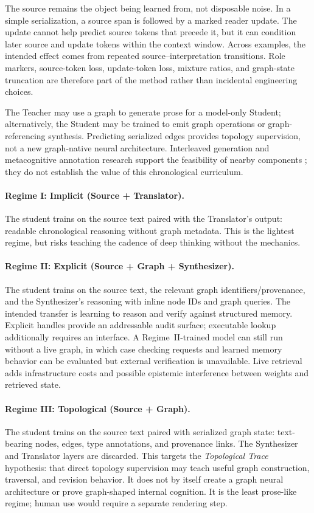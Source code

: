 The source remains the object being learned from, not disposable noise. In a
simple serialization, a source span is followed by a marked reader update. The
update cannot help predict source tokens that precede it, but it can condition
later source and update tokens within the context window. Across examples, the
intended effect comes from repeated source--interpretation transitions. Role
markers, source-token loss, update-token loss, mixture ratios, and graph-state
truncation are therefore part of the method rather than incidental engineering
choices.

The Teacher may use a graph to generate prose for a model-only Student;
alternatively, the Student may be trained to emit graph operations or
graph-referencing synthesis. Predicting serialized edges provides topology
supervision, not a new graph-native neural architecture. Interleaved generation
and metacognitive annotation research support the feasibility of nearby
components \cite{xie2025interleaved,didolkar2024metacognitive,korbak2023pretraining};
they do not establish the value of this chronological curriculum.

\paragraph{Regime I: Implicit (Source + Translator).} The student trains on the
source text paired with the Translator's output: readable chronological
reasoning without graph metadata. This is the lightest regime, but risks
teaching the cadence of deep thinking without the mechanics.

\paragraph{Regime II: Explicit (Source + Graph + Synthesizer).} The student
trains on the source text, the relevant graph identifiers/provenance, and the
Synthesizer's reasoning with inline node IDs and graph queries. The intended transfer is learning to
reason and verify against structured memory. Explicit handles provide an
addressable audit surface; executable lookup additionally requires an
interface. A Regime~II-trained model can still run without a live graph, in
which case checking requests and learned memory behavior can be evaluated but
external verification is unavailable. Live retrieval adds infrastructure costs
and possible epistemic interference between weights and retrieved state.

\paragraph{Regime III: Topological (Source + Graph).} The student trains on the
source text paired with serialized graph state: text-bearing nodes, edges, type
annotations, and provenance links. The Synthesizer and Translator layers are
discarded. This targets the \emph{Topological Trace}
hypothesis\label{sec:topological-mind}: that direct topology supervision may
teach useful graph construction, traversal, and revision behavior. It does not
by itself create a graph neural architecture or prove graph-shaped internal
cognition. It is the least prose-like regime; human use would require a
separate rendering step.

